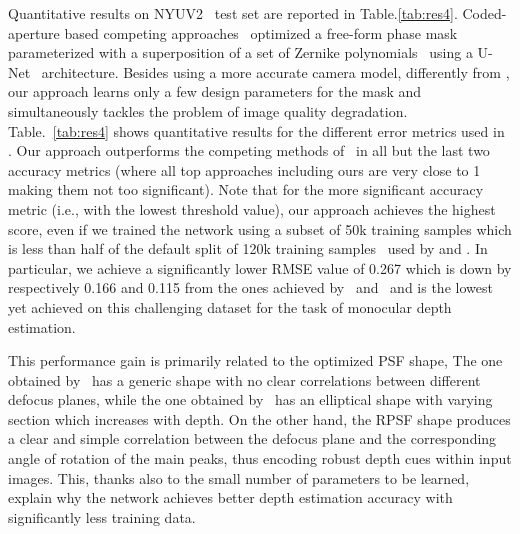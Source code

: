 \documentclass[preprint,5p,twocolumn]{elsarticle}
\begin{document}
Quantitative results on NYUV2~\cite{eigen2015predicting} test set are reported in Table.\ref{tab:res4}. 
Coded-aperture based competing approaches~\cite{chang2019deep,wu2019phasecam3d} optimized a free-form phase mask parameterized with a superposition of a set of Zernike polynomials~\cite{iskander2001optimal,born2013principles} using a  U-Net~\cite{ronneberger2015u} architecture. Besides using a more accurate camera model, differently from \cite{chang2019deep,wu2019phasecam3d}, our approach learns only a few design parameters for the mask and simultaneously tackles the problem of image quality degradation.
Table.~\ref{tab:res4} shows quantitative results for the different error metrics used in \cite{eigen2014depth}. Our approach outperforms the competing methods of~\cite{chang2019deep,wu2019phasecam3d} in all but the last two accuracy metrics (where all top approaches including ours are very close to 1 making them not too significant). 
Note that for the more significant accuracy metric  (i.e., with the lowest threshold value), our approach achieves the highest score, even if we trained the network using a subset of 50k training samples which is less than half of the default split of 120k training samples~\cite{eigen2014depth} used by \cite{chang2019deep} and \cite{wu2019phasecam3d}. In particular, we achieve a significantly lower RMSE value of 0.267 which is down by respectively 0.166 and 0.115 from the ones achieved by~\cite{chang2019deep} and~\cite{wu2019phasecam3d} and is the lowest yet achieved on this challenging dataset for the task of monocular depth estimation.

This performance gain is primarily related to the optimized PSF shape, The one obtained by~\cite{wu2019phasecam3d} has a generic shape with no clear correlations between different defocus planes, while the one obtained by~\cite{chang2019deep} has an elliptical shape with varying section which increases with depth. On the other hand, the RPSF shape produces a clear and simple correlation between the defocus plane and the corresponding angle of rotation of the main peaks, thus encoding robust depth cues within input images. This, thanks also to the small number of parameters to be learned, explain why the network achieves better depth estimation accuracy with significantly less training data.
\end{document}
